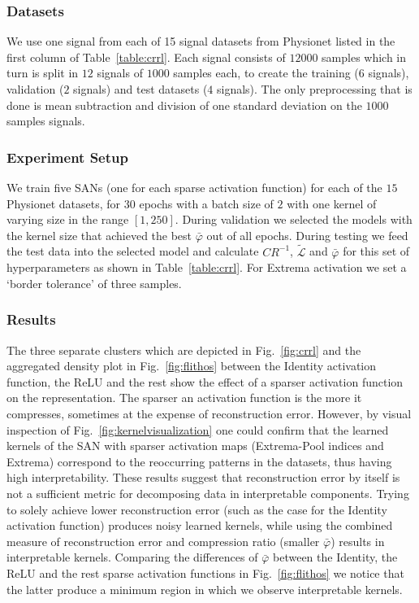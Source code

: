\documentclass[journal]{IEEEtran}
\begin{document}
\subsubsection{Datasets}
We use one signal from each of 15 signal datasets from Physionet listed in the first column of Table~\ref{table:crrl}.
Each signal consists of $12000$ samples which in turn is split in $12$ signals of $1000$ samples each, to create the training ($6$ signals), validation ($2$ signals) and test datasets ($4$ signals).
The only preprocessing that is done is mean subtraction and division of one standard deviation on the $1000$ samples signals.

\subsubsection{Experiment Setup}
We train five SANs (one for each sparse activation function) for each of the $15$ Physionet datasets, for $30$ epochs with a batch size of $2$ with one kernel of varying size in the range $[1, 250]$.
During validation we selected the models with the kernel size that achieved the best $\bar\varphi$ out of all epochs.
During testing we feed the test data into the selected model and calculate $CR^{-1}$, $\tilde{\mathcal{L}}$ and $\bar\varphi$ for this set of hyperparameters as shown in Table~\ref{table:crrl}.
For Extrema activation we set a `border tolerance' of three samples.

\subsubsection{Results}
The three separate clusters which are depicted in Fig.~\ref{fig:crrl} and the aggregated density plot in Fig.~\ref{fig:flithos} between the Identity activation function, the ReLU and the rest show the effect of a sparser activation function on the representation.
The sparser an activation function is the more it compresses, sometimes at the expense of reconstruction error.
However, by visual inspection of Fig.~\ref{fig:kernelvisualization} one could confirm that the learned kernels of the SAN with sparser activation maps (Extrema-Pool indices and Extrema) correspond to the reoccurring patterns in the datasets, thus having high interpretability.
These results suggest that reconstruction error by itself is not a sufficient metric for decomposing data in interpretable components.
Trying to solely achieve lower reconstruction error (such as the case for the Identity activation function) produces noisy learned kernels, while using the combined measure of reconstruction error and compression ratio (smaller $\bar\varphi$) results in interpretable kernels.
Comparing the differences of $\bar\varphi$ between the Identity, the ReLU and the rest sparse activation functions in Fig.~\ref{fig:flithos} we notice that the latter produce a minimum region in which we observe interpretable kernels.
\end{document}
